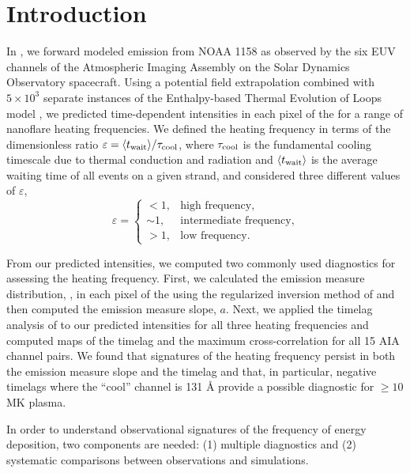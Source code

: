 \section{Introduction}\label{introduction}


In \citet[ hereafter]{barnes_understanding_2019}, we forward modeled emission from \AR{} NOAA 1158 as observed by the six EUV channels of the Atmospheric Imaging Assembly \citep[AIA,][]{lemen_atmospheric_2012} on the Solar Dynamics Observatory \citep[SDO,][]{pesnell_solar_2012} spacecraft. Using a potential field extrapolation combined with $5\times10^3$ separate instances of the Enthalpy-based Thermal Evolution of Loops model \citep[EBTEL,][]{klimchuk_highly_2008,cargill_enthalpy-based_2012,cargill_enthalpy-based_2012-1,barnes_inference_2016}, we predicted time-dependent intensities in each pixel of the \AR{} for a range of nanoflare heating frequencies. We defined the heating frequency in terms of the dimensionless ratio $\varepsilon = \langle t_{\textup{wait}}\rangle/\tau_{\textup{cool}}$, where $\tau_{\textup{cool}}$ is the fundamental cooling timescale due to thermal conduction and radiation and $\langle t_{\textup{wait}}\rangle$ is the average waiting time of all events on a given strand, and considered three different values of $\varepsilon$,
\begin{equation}\label{eq:heating_types}
    \varepsilon = 
    \begin{cases} 
        < 1, &  \text{high frequency},\\
        \sim1, & \text{intermediate frequency}, \\
        > 1, & \text{low frequency}.
     \end{cases}
\end{equation}

From our predicted intensities, we computed two commonly used diagnostics for assessing the heating frequency. First, we calculated the emission measure distribution, \dem, in each pixel of the \AR{} using the regularized inversion method of \citet{hannah_differential_2012} and then computed the emission measure slope, $a$. Next, we applied the timelag analysis of \citet{viall_evidence_2012} to our predicted intensities for all three heating frequencies and computed maps of the timelag and the maximum cross-correlation for all 15 AIA channel pairs. We found that signatures of the heating frequency persist in both the emission measure slope and the timelag and that, in particular, negative timelags where the ``cool'' channel is 131 \AA{} provide a possible diagnostic for $\ge10$ MK plasma.

In order to understand observational signatures of the frequency of energy deposition, two components are needed: (1) multiple diagnostics and (2) systematic comparisons between observations and simulations.

